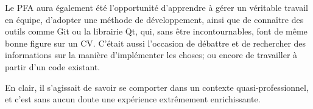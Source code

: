 Le PFA aura également été l'opportunité d'apprendre à gérer un véritable travail en équipe, d'adopter une méthode de développement, ainsi que de connaître des outils comme Git ou la librairie Qt, qui, sans être incontournables, font de même bonne figure sur un CV. C'était aussi l'occasion de débattre et de rechercher des informations sur la manière d'implémenter les choses; ou encore de travailler à partir d'un code existant.

En clair, il s'agissait de savoir se comporter dans un contexte quasi-professionnel, et c'est sans aucun doute une expérience extrêmement enrichissante.
